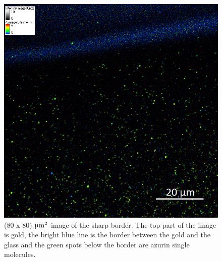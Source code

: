 \documentclass[twoside,single]{lion-msc}
\begin{document}
\begin{figure}[ht!]
\centering
\includegraphics[width=\textwidth]{border_legenda}
\caption{(80 x 80) $\upmu \textup{m}^{2}$ image of the sharp border. The top part of the image is gold, the bright blue line is the border between the gold and the glass and the green spots below the border are azurin single molecules.}
\label{border}
\end{figure}
\end{document}

